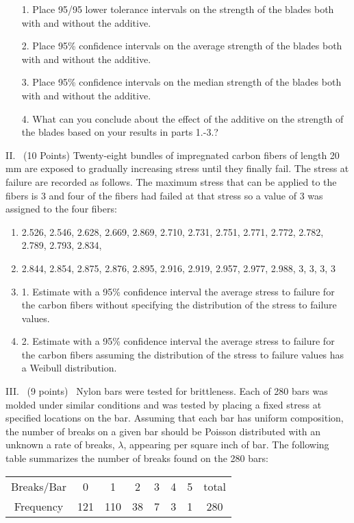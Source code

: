 \documentclass[10pt]{report}
\def\be{\begin{enumerate}}
\def\ee{\end{enumerate}}
\begin{document}
\vskip2mm
\begin{enumerate}
\item[1.] Place 95/95 lower tolerance intervals on the strength of the blades both with  and without the additive.
\item[2.] Place 95\% confidence intervals on the average strength of the blades both with  and without the additive.
\item[3.] Place 95\% confidence intervals on the median strength of the blades both with  and without the additive.
\item[4.] What can you conclude about the effect of the additive on the strength of the blades based on your results in parts 1.-3.?
\end{enumerate}
\item[II.] \ (10 Points)  Twenty-eight bundles of impregnated carbon fibers of length 20 mm are exposed to gradually
increasing stress until they finally fail. The stress at failure are recorded as follows. The maximum stress that can be
applied to the fibers is 3 and four of the fibers had failed at that stress so a value of 3 was assigned to the four fibers:
\vskip2mm
\be
\item[]2.526,  2.546,  2.628,  2.669,  2.869,  2.710,  2.731,  2.751,  2.771,  2.772,  2.782,  2.789,  2.793, 2.834,
\item[]  2.844, 2.854,  2.875,  2.876,  2.895,  2.916,  2.919,  2.957,  2.977,  2.988,  3,  3,  3,  3
\item[1.] Estimate with a 95\% confidence interval the average stress to failure for the carbon fibers without specifying
the distribution of the stress to failure values.
\item[2.] Estimate with a 95\% confidence interval the average stress to failure for the carbon fibers assuming
the distribution of the stress to failure values has a Weibull distribution.
\ee
\vskip2mm
\item[III.] \ (9 points) \ Nylon bars were tested for brittleness. Each of 280
bars was molded under similar conditions and was tested by placing a fixed
stress at specified locations on the bar. Assuming
that each bar has uniform composition, the number of breaks on a given bar
should be Poisson distributed with an unknown a rate of breaks, $\lambda$, appearing per square inch of bar.
The following table summarizes the number of breaks found on the 280 bars:
\begin{center}
\begin{tabular}{|c|cccccc|c|} \hline
Breaks/Bar &  0   &   1 &  2 & 3 & 4 & 5 & total \\
Frequency  &  121 & 110 & 38 & 7 & 3 & 1 & 280   \\ \hline
\end{tabular}
\end{center}
\end{document}
